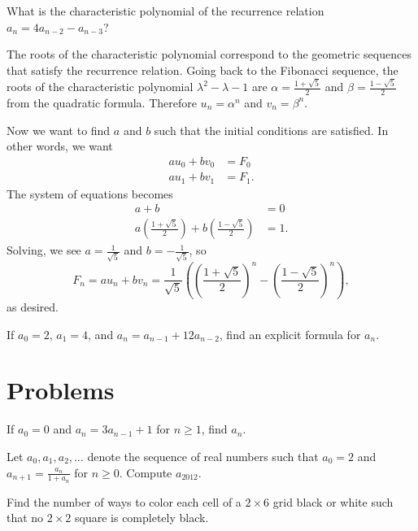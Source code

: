 \documentclass[11pt]{scrartcl}
\begin{document}
\begin{exercise}
    What is the characteristic polynomial of the recurrence relation $a_n = 4a_{n - 2} - a_{n - 3}$?
\end{exercise}

The roots of the characteristic polynomial correspond to the geometric sequences that satisfy the recurrence relation. Going back to the Fibonacci sequence, the roots of the characteristic polynomial $\lambda^2 - \lambda - 1$ are $\alpha = \frac{1 + \sqrt5}2$ and $\beta = \frac{1 - \sqrt5}2$ from the quadratic formula. Therefore $u_n = \alpha^n$ and $v_n = \beta^n$.

Now we want to find $a$ and $b$ such that the initial conditions are satisfied. In other words, we want
\begin{align*}
    au_0 + bv_0 &= F_0\\
    au_1 + bv_1 &= F_1.
\end{align*}
The system of equations becomes
\begin{align*}
    a + b &= 0\\
    a\left( \frac{1 + \sqrt{5}}{2} \right) + b\left( \frac{1 - \sqrt{5}}{2} \right) &= 1.
\end{align*}
Solving, we see $a = \frac{1}{\sqrt{5}}$ and $b = -\frac{1}{\sqrt{5}}$, so
\[F_n = au_n + bv_n = \frac{1}{\sqrt{5}}\left(\left(\frac{1 + \sqrt5}2\right)^n - \left(\frac{1 - \sqrt5}2\right)^n\right),\]
as desired.

\begin{exercise}
    If $a_0 = 2$, $a_1 = 4$, and $a_n = a_{n - 1} + 12a_{n - 2}$, find an explicit formula for $a_n$.
\end{exercise}

\section{Problems}

\begin{problem}
    \label{pro:trivial}
    If $a_0 = 0$ and $a_n = 3a_{n - 1} + 1$ for $n \ge 1$, find $a_n$.
\end{problem}

\begin{problem}
    \label{pro:hmmt-guts}
    Let $a_0,a_1,a_2,\dots$ denote the sequence of real numbers such that $a_0 = 2$ and $a_{n + 1} = \frac{a_n}{1 + a_n}$ for $n \ge 0$. Compute $a_{2012}$.
\end{problem}

\begin{problem}
    \label{pro:grid-classic}
    Find the number of ways to color each cell of a $2 \times 6$ grid black or white such that no $2 \times 2$ square is completely black.
\end{problem}
\end{document}
